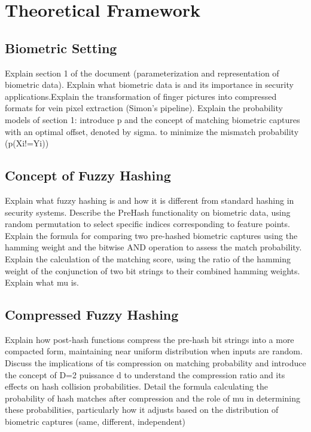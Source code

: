 \section{Theoretical Framework}

\subsection{Biometric Setting}
Explain section 1 of the document (parameterization and representation of biometric data). Explain what biometric data is and its importance in security applications.Explain the transformation of finger pictures into compressed formats for vein pixel extraction (Simon's pipeline). Explain the probability models of section 1: introduce p and the concept of matching biometric captures with an optimal offset, denoted by sigma. to minimize the mismatch probability (p(Xi!=Yi))

\subsection{Concept of Fuzzy Hashing}
Explain what fuzzy hashing is and how it is different from standard hashing in security systems. Describe the PreHash functionality on biometric data, using random permutation to select specific indices corresponding to feature points. Explain the formula for comparing two pre-hashed biometric captures using the hamming weight and the bitwise AND operation to assess the match probability. 
Explain the calculation of the matching score, using the ratio of the hamming weight of the conjunction of two bit strings to their combined hamming weights. Explain what mu is.

\subsection{Compressed Fuzzy Hashing}
Explain how post-hash functions compress the pre-hash bit strings into a more compacted form, maintaining near uniform distribution when inputs are random. Discuss the implications of tis compression on matching probability and introduce the concept of D=2 puissance d to understand the compression ratio and its effects on hash collision probabilities.
Detail the formula calculating the probability of hash matches after compression and the role of mu in determining these probabilities, particularly how it adjusts based on the distribution of biometric captures (same, different, independent)

